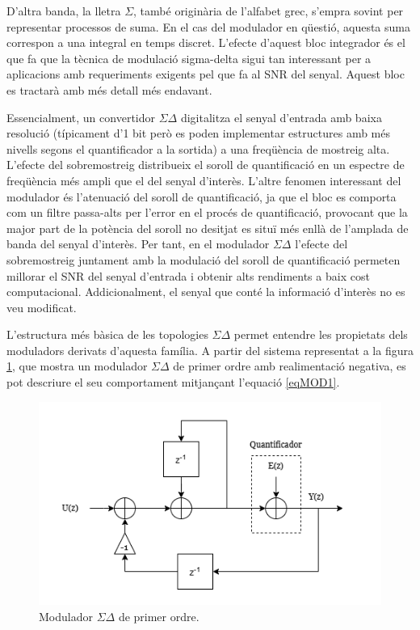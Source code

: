 \par D'altra banda, la lletra $\Sigma$, també originària de l'alfabet grec, s'empra sovint per representar processos de suma. En el cas del modulador en qüestió, aquesta suma correspon a una integral en temps discret. L'efecte d'aquest bloc integrador és el que fa que la tècnica de modulació sigma-delta sigui tan interessant per a aplicacions amb requeriments exigents pel que fa al SNR del senyal. Aquest bloc es tractarà amb més detall més endavant. 
\par Essencialment, un convertidor $\Sigma \Delta$ digitalitza el senyal d'entrada amb baixa resolució (típicament d'1 bit però es poden implementar estructures amb més nivells segons el quantificador a la sortida) a una freqüència de mostreig alta. L'efecte del sobremostreig distribueix el soroll de quantificació en un espectre de freqüència més ampli que el del senyal d'interès. L'altre fenomen interessant del modulador és l'atenuació del soroll de quantificació, ja que el bloc es comporta com un filtre passa-alts per l'error en el procés de quantificació, provocant que la major part de la potència del soroll no desitjat es situï més enllà de l'amplada de banda del senyal d'interès. Per tant, en el modulador $\Sigma \Delta$ l'efecte del sobremostreig juntament amb la modulació del soroll de quantificació permeten millorar el SNR del senyal d'entrada i obtenir alts rendiments a baix cost computacional. Addicionalment, el senyal que conté la informació d'interès no es veu modificat. 
\par L'estructura més bàsica de les topologies $\Sigma \Delta$ permet entendre les propietats dels moduladors derivats d'aquesta família. A partir del sistema representat a la figura \ref{figMOD1}, que mostra un modulador $\Sigma \Delta$ de primer ordre amb realimentació negativa, es pot descriure el seu comportament mitjançant l'equació \ref{eqMOD1}.
\begin{figure}[H]
    \centering
    \includegraphics[width=0.5\linewidth]{Images/SigmaDeltaMOD1.drawio.png}
    \caption{Modulador $\Sigma \Delta$ de primer ordre.}
    \label{figMOD1}
\end{figure}

